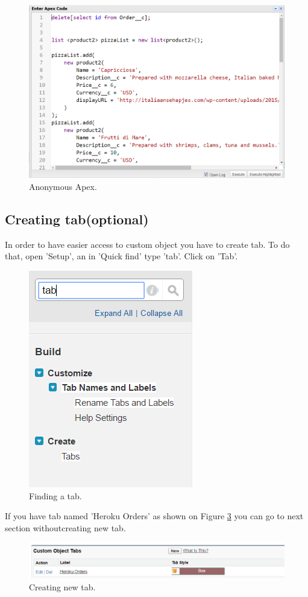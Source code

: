 \documentclass[12pt,a4paper]{article}
\begin{document}
\begin{figure}[H]
	\centering
	\includegraphics[width=1\textwidth]{images/deploy2.PNG}
	\caption{Anonymous Apex.}
	\label{fig:apex}
\end{figure}

\subsection{Creating tab(optional)}

In order to have easier access to custom object you have to create tab. To do that, open 'Setup', an in 'Quick find' type 'tab'. Click on 'Tab'.

\begin{figure}[H]
	\centering
	\includegraphics{images/tab.PNG}
	\caption{Finding a tab.}
	\label{fig:tab}
\end{figure}
If you have tab named 'Heroku Orders' as shown on Figure \ref{fig:tabb} you can go to next section withoutcreating new tab.
\begin{figure}[H]
	\centering
	\includegraphics{images/create.PNG}
	\caption{Creating new tab.}
	\label{fig:tabb}
\end{figure}
\end{document}

